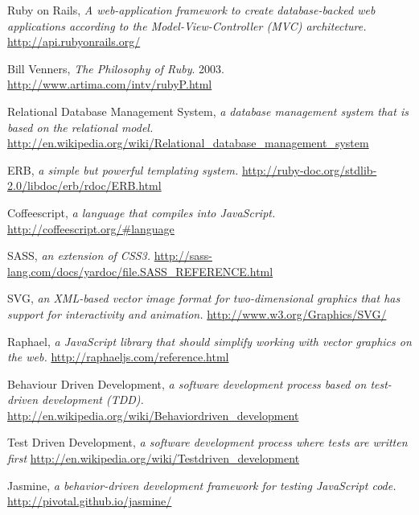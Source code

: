 \documentclass{report}
\begin{document}
\begin{thebibliography}{9}

Ruby on Rails,
\emph{A web-application framework to create database-backed web applications according to the Model-View-Controller (MVC) architecture.}
\href{http://api.rubyonrails.org/}{http://api.rubyonrails.org/}

Bill Venners,
\emph{The Philosophy of Ruby}.
2003.
\href{http://www.artima.com/intv/rubyP.html}{http://www.artima.com/intv/rubyP.html}

Relational Database Management System, 
\emph{a database management system that is based on the relational model.}
\href{http://en.wikipedia.org/wiki/Relational\_database\_management\_system}{http://en.wikipedia.org/wiki/Relational\_database\_management\_system}

ERB,
\emph{a simple but powerful templating system.}
\href{http://ruby-doc.org/stdlib-2.0/libdoc/erb/rdoc/ERB.html}{http://ruby-doc.org/stdlib-2.0/libdoc/erb/rdoc/ERB.html}

Coffeescript,
\emph{a language that compiles into JavaScript.}
\href{http://coffeescript.org/\#language}{http://coffeescript.org/\#language}

SASS,
\emph{ an extension of CSS3.}
\href{http://sass-lang.com/docs/yardoc/file.SASS\_REFERENCE.html}{http://sass-lang.com/docs/yardoc/file.SASS\_REFERENCE.html}

SVG,
\emph{an XML-based vector image format for two-dimensional graphics that has support for interactivity and animation.}
\href{http://www.w3.org/Graphics/SVG/}{http://www.w3.org/Graphics/SVG/}

Raphael,
\emph{a JavaScript library that should simplify working with vector graphics on the web.}
\href{http://raphaeljs.com/reference.html}{http://raphaeljs.com/reference.html}

Behaviour Driven Development,
\emph{a software development process based on test-driven development (TDD).}
\href{http://en.wikipedia.org/wiki/Behavior\-driven\_development}{http://en.wikipedia.org/wiki/Behavior\-driven\_development}

Test Driven Development,
\emph{a software development process where tests are written first}
\href{http://en.wikipedia.org/wiki/Test\-driven\_development}{http://en.wikipedia.org/wiki/Test\-driven\_development}

Jasmine,
\emph{a behavior-driven development framework for testing JavaScript code.}
\href{http://pivotal.github.io/jasmine/}{http://pivotal.github.io/jasmine/}


\end{thebibliography}
\end{document}
